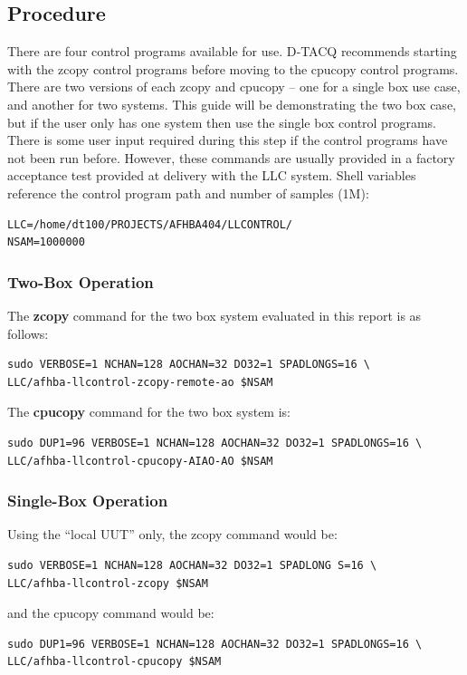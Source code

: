 \documentclass{article}
\begin{document}
\subsection{Procedure}
There are four control programs available for use.
D‑TACQ  recommends starting with the zcopy control programs before moving to the cpucopy control programs.
There are two versions of each zcopy and cpucopy – one for a single box use case, and another for two systems.
This guide will be demonstrating the two box case, but if the user only has one system then use the single box control programs.
There is some user input required during this step if the control programs have not been run before.
However, these commands are usually provided in a factory acceptance test provided at delivery with the LLC system.
Shell variables reference the control program path and number of samples (1M):
\begin{verbatim}
LLC=/home/dt100/PROJECTS/AFHBA404/LLCONTROL/
NSAM=1000000
\end{verbatim}

\subsubsection{Two-Box Operation}
The \textbf{zcopy} command for the two box system evaluated in this report is as follows:

\begin{verbatim}
sudo VERBOSE=1 NCHAN=128 AOCHAN=32 DO32=1 SPADLONGS=16 \
LLC/afhba-llcontrol-zcopy-remote-ao $NSAM
\end{verbatim}

The \textbf{cpucopy} command for the two box system is:
\begin{verbatim}
sudo DUP1=96 VERBOSE=1 NCHAN=128 AOCHAN=32 DO32=1 SPADLONGS=16 \
LLC/afhba-llcontrol-cpucopy-AIAO-AO $NSAM
\end{verbatim}

\subsubsection{Single-Box Operation}

Using the “local UUT” only, the zcopy command would be:
\begin{verbatim}
sudo VERBOSE=1 NCHAN=128 AOCHAN=32 DO32=1 SPADLONG S=16 \
LLC/afhba-llcontrol-zcopy $NSAM
\end{verbatim}

and the cpucopy command would be:

\begin{verbatim}
sudo DUP1=96 VERBOSE=1 NCHAN=128 AOCHAN=32 DO32=1 SPADLONGS=16 \
LLC/afhba-llcontrol-cpucopy $NSAM
\end{verbatim}
\end{document}

